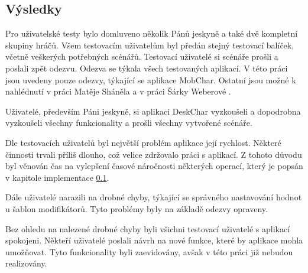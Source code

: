\documentclass[thesis=B,czech]{resources/FITthesis}[2012/06/26]
\begin{document}
\subsection{Výsledky}
Pro uživatelské testy bylo domluveno několik Pánů jeskyně a také dvě kompletní skupiny hráčů. Všem testovacím uživatelům byl předán stejný testovací balíček, včetně veškerých potřebných scénářů. Testovací uživatelé si scénáře prošli a poslali zpět odezvu. Odezva se týkala všech testovaných aplikací. V této práci jsou uvedeny pouze odezvy, týkající se aplikace MobChar. Ostatní jsou možné k nahlédnutí v práci Matěje Sháněla\cite{Shanel_2017} a v práci Šárky Weberové \cite{Weberova_2017}. \par

Uživatelé, především Páni jeskyně, si aplikaci DeskChar vyzkoušeli a dopodrobna vyzkoušeli všechny funkcionality a prošli všechny vytvořené scénáře. \par

Dle testovacích uživatelů byl největší problém aplikace její rychlost. Některé činnosti trvali příliš dlouho, což velice zdržovalo práci s aplikací. Z tohoto důvodu byl věnován čas na vylepšení časové náročnosti některých operací, který je popsán v kapitole implementace \ref{}. \par

Dále uživatelé narazili na drobné chyby, týkající se správného nastavování hodnot u šablon modifikátorů. Tyto problémy byly na základě odezvy opraveny. \par

Bez ohledu na nalezené drobné chyby byli všichni testovací uživatelé s aplikací spokojeni. Někteří uživatelé poslali návrh na nové funkce, které by aplikace mohla umožňovat. Tyto funkcionality byli zaevidovány, avšak v této práci již nebudou realizovány. 

\begin{conclusion}
\end{conclusion}




\appendix
\end{document}
